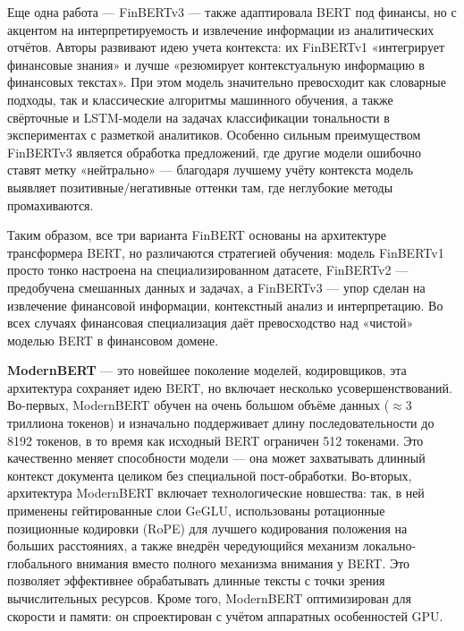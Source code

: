 Еще одна работа — FinBERTv3 \parencite{Yang2020FinBERT, Huang2023FinBERT} --- также адаптировала BERT
под финансы, но с акцентом на интерпретируемость и извлечение информации из аналитических отчётов. Авторы
развивают идею учета контекста: их FinBERTv1 «интегрирует финансовые знания» и лучше «резюмирует
контекстуальную информацию в финансовых текстах». При этом модель значительно превосходит как словарные
подходы, так и классические алгоритмы машинного обучения, а также свёрточные и LSTM-модели на задачах
классификации тональности в экспериментах с разметкой аналитиков. Особенно сильным преимуществом FinBERTv3 \parencite{Yang2020FinBERT}
является обработка предложений, где другие модели ошибочно ставят метку «нейтрально» --- благодаря лучшему
учёту контекста модель выявляет позитивные/негативные оттенки там, где неглубокие методы промахиваются.

Таким образом, все три варианта FinBERT основаны на архитектуре трансформера BERT, но различаются стратегией
обучения: модель FinBERTv1 просто тонко настроена на специализированном датасете, FinBERTv2 --- предобучена
смешанных данных и задачах, а FinBERTv3 --- упор сделан на извлечение финансовой информации, контекстный
анализ и интерпретацию. Во всех случаях финансовая специализация даёт превосходство над «чистой» моделью
BERT в финансовом домене.

\textbf{ModernBERT} \parencite{Warner2024ModernBERT} --- это новейшее поколение моделей, кодировщиков, эта архитектура сохраняет идею BERT,
но включает несколько усовершенствований. Во-первых, ModernBERT обучен на очень большом объёме данных ($\approx$3
триллиона токенов) и изначально поддерживает длину последовательности до 8192 токенов, в то время как исходный
BERT ограничен 512 токенами. Это качественно меняет способности модели — она может захватывать длинный контекст
документа целиком без специальной пост-обработки. Во-вторых, архитектура ModernBERT включает технологические
новшества: так, в ней применены гейтированные слои GeGLU, использованы ротационные позиционные кодировки (RoPE)
для лучшего кодирования положения на больших расстояниях, а также внедрён чередующийся механизм локально-глобального
внимания вместо полного механизма внимания у BERT. Это позволяет эффективнее обрабатывать длинные тексты с точки
зрения вычислительных ресурсов. Кроме того, ModernBERT оптимизирован для скорости и памяти: он спроектирован
с учётом аппаратных особенностей GPU.

